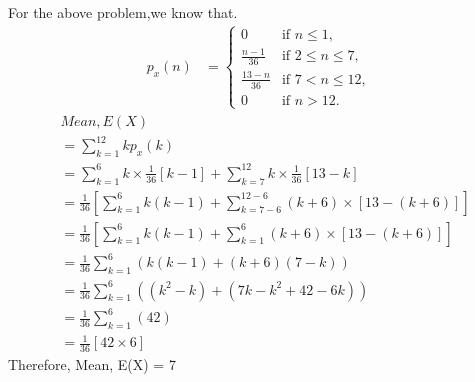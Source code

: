 \documentclass[journal,12pt,twocolumn]{IEEEtran}
\begin{document}
\begin{table}[hbt!]
\caption{Probability Distribution Table of X}
\label{table:1}
\end{table}
For the above problem,we know that.
\begin{align}
p_x(n) &= 
  \begin{cases}
    0 & \text{if } n \leq 1,\\
    \frac{n-1}{36} & \text{if } 2 \leq n \leq 7,\\
    \frac{13-n}{36} & \text{if } 7 < n \leq 12,\\
    0 & \text{if } n>12.
  \end{cases}
\end{align}
\begin{align}
    &Mean,E(X)\\
    & =\sum_{k=1}^{12} kp_x(k)\\
    & = \sum_{k=1}^{6}k\times\frac{1}{36}[k-1] + \sum_{k=7}^{12}k\times\frac{1}{36}[13-k]\\
    & = \frac{1}{36}\left[\sum_{k=1}^{6}k(k-1) + \sum_{k=7-6}^{12-6}(k+6)\times[13-(k+6)]\right]\\
    & = \frac{1}{36}\left[\sum_{k=1}^{6}k(k-1) + \sum_{k=1}^{6}(k+6)\times[13-(k+6)]\right]\\
    &= \frac{1}{36}\sum_{k=1}^{6}\left(k(k-1) + (k+6)(7-k)\right)\\
    &= \frac{1}{36}\sum_{k=1}^{6}\left((k^2- k)+ (7k-k^2+42-6k)\right)\\
    &= \frac{1}{36}\sum_{k=1}^{6}\left( 42\right)\\
    &= \frac{1}{36}\left[ 42 \times 6 \right]
\end{align}
Therefore,
 Mean, E(X) = 7
 
\end{document}
